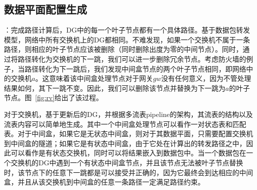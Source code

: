 \subsection{数据平面配置生成}

：完成路径计算后，DG中的每一个叶子节点都有一个具体路径。基于数据包转发模型，网络中所有交换机上的DG都相同。不难发现，如果一个交换机不属于一条路径，则相应的叶子节点应该被删除（同时删除出度为零的中间节点）。同时，通过将路径转化为交换机的下一跳，我们可以进一步删除冗余节点。考虑防火墙的例子，当路径转化为下一跳后，我们发现中间盒节点的两个叶子节点相同，即网络中的交换机$a$。这意味着该中间盒处理节点对于网关$gw$没有任何意义，因为不管处理结果如何，其下一跳不变。因此，我们可以删除该节点并替换为下一跳为$a$的叶子节点。图~\ref{fig:rv}给出了该过程。



对于交换机，基于更新后的DG，并根据多流表pipeline的架构，其流表的结构以及流表内容可以简单地生成。其中一个中间盒处理节点可以看作一对状态表和匹配表。对于中间盒，如果它是无状态中间盒，则对于其数据平面，只需要配置交换机到中间盒的隧道；如果它是有状态中间盒，由于它处在计算出的转发路径之中，因此可以看作是有状态交换机，同时可以将结果嵌入到数据包中。当一个数据包在一个交换机的DG中遇到一个有状态中间盒节点，并且该节点无法被叶子节点替换时，该节点下的任意下一跳都是可以接受并正确的，因为它最终会到达相应的中间盒，并且从该交换机到中间盒的任意一条路径一定满足路径约束。


